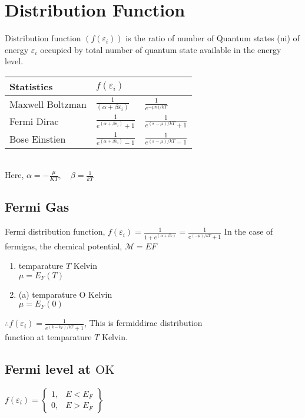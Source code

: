 \section{Distribution Function}
Distribution function $\left(f\left(\varepsilon_{i}\right)\right)$ is the ratio of number of Quantum states (ni) of energy $\varepsilon_{i}$ occupied by total number of quantum state available in the energy level.\\
\renewcommand*{\arraystretch}{2}
\begin{tabular}{|p{3cm}|p{3cm}|p{3cm}|}
	\hline
Statistics&$f\left(\varepsilon_{i}\right)$& \\\hline
Maxwell Boltzman&$\frac{1}{\left(\alpha+\beta \varepsilon_{i}\right)}$& $\frac{1}{e^{-\mu n) / k T}}$\\\hline
Fermi Dirac&$\frac{1}{e^{\left(\alpha+\beta \varepsilon_{i}\right)}+1}$&$\frac{1}{e^{(\varepsilon-\mu) / k T}+1}$\\\hline
Bose Einstien &$\frac{1}{e^{\left(\alpha+\beta \varepsilon_{i}\right)}-1}$&$\frac{1}{e^{(\varepsilon-\mu) / k T}-1}$\\\hline
\end{tabular}\\
Here, $\alpha=-\frac{\mu}{K T}, \quad \beta=\frac{1}{k T}$
\subsection{Fermi Gas}
Fermi distribution function, $f\left(\varepsilon_{i}\right)=\frac{1}{1+e^{(\alpha+\beta \varepsilon)}}=\frac{1}{e^{(-\mu) / k T}+1}$ In the case of fermigas, the chemical potential, $\mathcal{M}=E F$
\begin{enumerate}[label=\roman*)]
	\item temparature $T$ Kelvin\\
	$\mu=E_{F}(T)$
	\item (a) temparature O Kelvin\\
	$
	\mu=E_{F}(0)
	$
\end{enumerate}
$\therefore f\left(\varepsilon_{i}\right)=\frac{1}{e^{\left(k-k_{F}\right) / k T}+1}$, This is fermiddirac distribution\\
function at temparature $T$ Kelvin.
\subsection{Fermi level at $\mathrm{OK}$}
$f\left(\varepsilon_{i}\right)=\left\{\begin{array}{ll}1, & E<E_{F} \\ 0, & E>E_{F}\end{array}\right\}$
